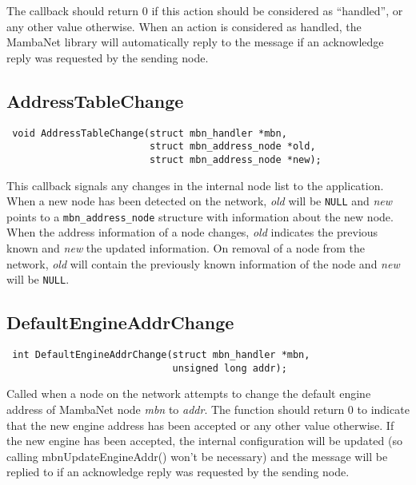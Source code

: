 The callback should return 0 if this action should be considered as ``handled'', or any other value otherwise. When an action is considered as handled, the MambaNet library will automatically reply to the message if an acknowledge reply was requested by the sending node.


\subsection{AddressTableChange}
\begin{verbatim}
 void AddressTableChange(struct mbn_handler *mbn,
                         struct mbn_address_node *old,
                         struct mbn_address_node *new);
\end{verbatim}
This callback signals any changes in the internal node list to the application. When a new node has been detected on the network, \textit{old} will be \verb|NULL| and \textit{new} points to a \verb|mbn_address_node| structure with information about the new node. When the address information of a node changes, \textit{old} indicates the previous known and \textit{new} the updated information. On removal of a node from the network, \textit{old} will contain the previously known information of the node and \textit{new} will be \verb|NULL|.


\subsection{DefaultEngineAddrChange}
\begin{verbatim}
 int DefaultEngineAddrChange(struct mbn_handler *mbn,
                             unsigned long addr);
\end{verbatim}
Called when a node on the network attempts to change the default engine address of MambaNet node \textit{mbn} to \textit{addr}. The function should return 0 to indicate that the new engine address has been accepted or any other value otherwise. If the new engine has been accepted, the internal configuration will be updated (so calling mbnUpdateEngineAddr() won't be necessary) and the message will be replied to if an acknowledge reply was requested by the sending node.


